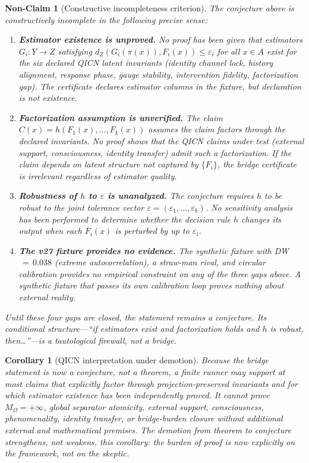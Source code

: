 \documentclass[11pt]{article}
\newtheorem{corollary}{Corollary}
\newtheorem{nonclaim}{Non-Claim}
\begin{document}
\begin{nonclaim}[Constructive incompleteness criterion]
The conjecture above is \emph{constructively incomplete} in the following precise sense:

\begin{enumerate}
\item \textbf{Estimator existence is unproved.} No proof has been given that estimators $G_i: Y \to Z$ satisfying $d_Z(G_i(\pi(x)), F_i(x)) \leq \varepsilon_i$ for all $x \in A$ exist for the six declared QICN latent invariants (identity channel lock, history alignment, response phase, gauge stability, intervention fidelity, factorization gap). The certificate \emph{declares} estimator columns in the fixture, but declaration is not existence.

\item \textbf{Factorization assumption is unverified.} The claim $C(x) = h(F_1(x), \ldots, F_k(x))$ assumes the claim factors through the declared invariants. No proof shows that the QICN claims under test (external support, consciousness, identity transfer) admit such a factorization. If the claim depends on latent structure not captured by $\{F_i\}$, the bridge certificate is irrelevant regardless of estimator quality.

\item \textbf{Robustness of $h$ to $\varepsilon$ is unanalyzed.} The conjecture requires $h$ to be robust to the joint tolerance vector $\varepsilon = (\varepsilon_1, \ldots, \varepsilon_k)$. No sensitivity analysis has been performed to determine whether the decision rule $h$ changes its output when each $F_i(x)$ is perturbed by up to $\varepsilon_i$.

\item \textbf{The v27 fixture provides no evidence.} The synthetic fixture with DW$\,{=}\,0.038$ (extreme autocorrelation), a straw-man rival, and circular calibration provides no empirical constraint on any of the three gaps above. A synthetic fixture that passes its own calibration loop proves nothing about external reality.
\end{enumerate}

Until these four gaps are closed, the statement remains a conjecture. Its conditional structure---``if estimators exist and factorization holds and $h$ is robust, then\ldots''---is a tautological firewall, not a bridge.
\end{nonclaim}

\begin{corollary}[QICN interpretation under demotion]
Because the bridge statement is now a conjecture, not a theorem, a finite runner may support \emph{at most} claims that explicitly factor through projection-preserved invariants \emph{and} for which estimator existence has been independently proved. It cannot prove $M_{\Omega}=+\infty$, global separator atomicity, external support, consciousness, phenomenality, identity transfer, or bridge-burden closure without additional external and mathematical premises. The demotion from theorem to conjecture strengthens, not weakens, this corollary: the burden of proof is now explicitly on the framework, not on the skeptic.
\end{corollary}
\end{document}
